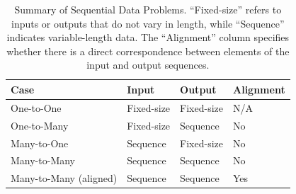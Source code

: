 \begin{table}[!htp]
    \centering
    \begin{tabular}{@{} l | l | l | l @{}}
        \toprule
        Case                    & Input         & Output        & Alignment \\
        \midrule
        One-to-One              & Fixed-size    & Fixed-size    & N/A \\
        One-to-Many             & Fixed-size    & Sequence      & No \\
        Many-to-One             & Sequence      & Fixed-size    & No \\
        Many-to-Many            & Sequence      & Sequence      & No \\
        Many-to-Many (aligned)  & Sequence      & Sequence      & Yes \\
        \bottomrule
    \end{tabular}
    \caption{Summary of Sequential Data Problems. ``Fixed-size'' refers to inputs or outputs that do not vary in length, while ``Sequence'' indicates variable-length data. The ``Alignment'' column specifies whether there is a direct correspondence between elements of the input and output sequences.}
\end{table}